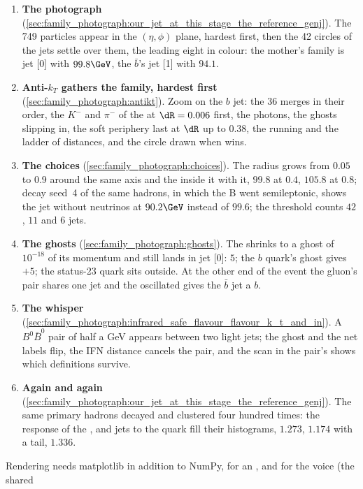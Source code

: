 \begin{enumerate}
  \item \textbf{The photograph} (\cref{sec:family_photograph:our_jet_at_this_stage_the_reference_genj}).
    The 749 particles appear in the $(\eta,\phi)$ plane, hardest first,
    then the 42 circles of the \antikt jets settle over them, the leading
    eight in colour: the mother's family is jet [0] with $99.8\GeV$, the
    $\bar b$'s jet [1] with $94.1$.
  \item \textbf{Anti-$k_T$ gathers the family, hardest first} (\cref{sec:family_photograph:antikt}).
    Zoom on the $b$ jet: the 36 merges in their order, the $K^-$ and
    $\pi^-$ of the \Bbar at $\dR=0.006$ first, the photons, the ghosts
    slipping in, the soft periphery last at $\dR$ up to $0.38$, the
    running \pt and the ladder of distances, and the circle drawn when
    \diB wins.
  \item \textbf{The choices} (\cref{sec:family_photograph:choices}).
    The radius grows from $0.05$ to $0.9$ around the same axis and the \pt
    inside it with it, $99.8$ at $0.4$, $105.8$ at $0.8$; decay seed~4 of
    the same hadrons, in which the B went semileptonic, shows the jet
    without neutrinos at $90.2\GeV$ instead of $99.6$; the threshold
    counts $42$, $11$ and $6$ jets.
  \item \textbf{The ghosts} (\cref{sec:family_photograph:ghosts}).
    The \Bbar shrinks to a ghost of $10^{-18}$ of its momentum and still
    lands in jet [0]: \hadflav $5$; the $b$ quark's ghost gives \partflav
    $+5$; the status-23 quark sits outside. At the other end of the event
    the gluon's pair shares one jet and the oscillated \Bz gives the
    $\bar b$ jet a $b$.
  \item \textbf{The whisper} (\cref{sec:family_photograph:infrared_safe_flavour_flavour_k_t_and_in}).
    A $B^0\bar B^0$ pair of half a GeV appears between two light jets; the
    ghost and the net labels flip, the IFN distance cancels the pair, and
    the scan in the pair's \pt shows which definitions survive.
  \item \textbf{Again and again} (\cref{sec:family_photograph:our_jet_at_this_stage_the_reference_genj}).
    The same primary hadrons decayed and clustered four hundred times: the
    response of the \akfour, \akfournonu and \akeight jets to the quark
    fill their histograms, $1.273$, $1.174$ with a tail, $1.336$.
\end{enumerate}
Rendering needs matplotlib in addition to NumPy,  for an
, and  for the voice (the shared
